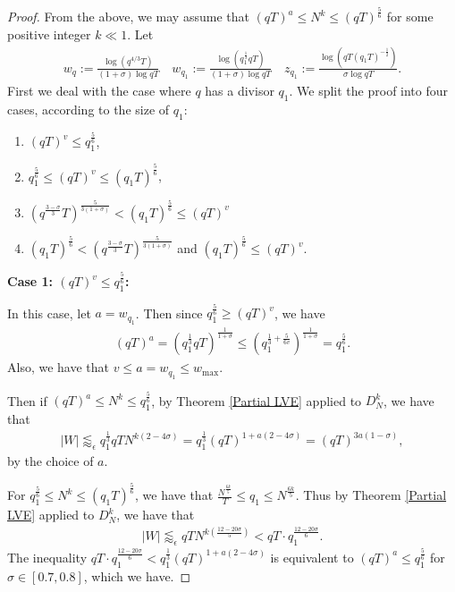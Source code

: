 \documentclass[12pt]{amsart}
\theoremstyle{definition}
\theoremstyle{plain}
\theoremstyle{remark}
\numberwithin{equation}{section}
\numberwithin{theorem}{section}
\numberwithin{equation}{section}
\begin{document}
	\begin{proof}
		From the above, we may assume that $(qT)^a \leq N^k \leq (qT)^{\frac{5}{6}}$ for some positive integer $k \ll 1$. Let 
		\begin{align*}
			w_q:= \frac{\log(q^{4/3}T)}{(1+\sigma)\log{qT}} \quad  w_{q_1}:= \frac{\log(q_1^{\frac{1}{3}}qT)}{(1+\sigma)\log{qT}} \quad  z_{q_1}:=\frac{\log(qT(q_1T)^{-\frac{1}{2}})}{\sigma \log{qT}}.
		\end{align*}
		First we deal with the case where $q$ has a divisor $q_1$. We split the proof into four cases, according to the size of $q_1$:
		\begin{enumerate}
			\item $(qT)^v \leq q_1^{\frac{5}{6}}$,
			\item $q_1^{\frac{5}{6}} \leq (qT)^{v} \leq (q_1T)^{\frac{5}{6}}$,
			\item $(q^{\frac{3-\sigma}{3}}T)^{\frac{5}{3(1+\sigma)}}<(q_1T)^{\frac{5}{6}} \leq (qT)^v$
			\item $ (q_1T)^{\frac{5}{6}}<(q^{\frac{3-\sigma}{3}}T)^{\frac{5}{3(1+\sigma)}}$  and $(q_1T)^{\frac{5}{6}} \leq (qT)^v$.
		\end{enumerate}
		
		\noindent \textbf{Case 1: $(qT)^v \leq q_1^{\frac{5}{6}}$:}
		
		In this case, let $a= w_{q_1}$. Then since $q_1^{\frac{5}{6}} \geq (qT)^v$, we have
		\begin{align*}
			(qT)^a = (q_1^{\frac{1}{3}}qT)^{\frac{1}{1+\sigma}} \leq (q_1^{\frac{1}{3}+\frac{5}{6v}})^{\frac{1}{1+\sigma}} = q_1^{\frac{5}{6}}.
		\end{align*}
		Also, we have that $v \leq a=w_{q_1} \leq w_{\text{max}}$.
		
		Then if $(qT)^a \leq N^k \leq q_1^{\frac{5}{6}}$, by Theorem \ref{Partial LVE} applied to $D_N^k$, we have that
		\begin{align*}
			|W| \lessapprox_{\epsilon} q_1^{\frac{1}{3}}qTN^{k(2-4\sigma)} = q_1^{\frac{1}{3}}(qT)^{1+a(2-4\sigma)} = (qT)^{3a(1-\sigma)},
		\end{align*}
		by the choice of $a$.
		
		For $q_1^{\frac{5}{6}} \leq N^k \leq (q_1T)^{\frac{5}{6}}$, we have that $\frac{N^{\frac{6k}{5}}}{T} \leq q_1 \leq N^{\frac{6k}{5}}$. Thus by Theorem \ref{Partial LVE} applied to $D_N^k$, we have that 
		\begin{align*}
			|W| \lessapprox_{\epsilon} qTN^{k(\frac{12-20\sigma}{5})} < qT \cdot q_1^{\frac{12-20\sigma}{6}}.
		\end{align*}
		The inequality $qT \cdot q_1^{\frac{12-20\sigma}{6}}< q_1^{\frac{1}{3}}(qT)^{1+a(2-4\sigma)}$ is equivalent to $(qT)^a \leq q_1^{\frac{5}{6}}$ for $\sigma \in [0.7,0.8]$, which we have.
		

\end{proof}
\end{document}
